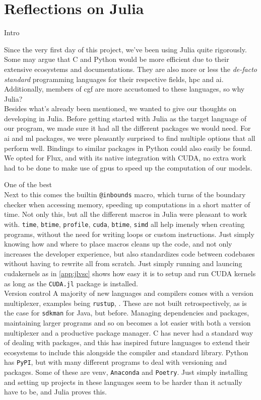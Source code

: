 \section*{Reflections on Julia}
\label{sec:juliaref}

Intro

Since the very first day of this project, we've been using Julia quite rigorously. Some may argue that C and Python would be more efficient due to their extensive ecosystems and documentations. They are also more or less the \textit{de-facto standard} programming languages for their respective fields, \acrshort{hpc} and \acrshort{ai}. Additionally, members of \acrshort{cgf} are more accustomed to these languages, so why Julia? \\

Besides what's already been mentioned, we wanted to give our thoughts on developing in Julia. Before getting started with Julia as the target language of our program, we made sure it had all the different packages we would need. For \acrshort{ai} and \acrshort{ml} packages, we were pleasantly surprised to find multiple options that all perform well. Bindings to similar packages in Python could also easily be found. We opted for Flux, and with its native integration with CUDA, no extra work had to be done to make use of \acrshort{gpu}s to speed up the computation of our models.

One of the best \\ 
Next to this comes the builtin \texttt{@inbounds} macro, which turns of the boundary checker when accessing memory, speeding up computations in a short matter of time. Not only this, but all the different macros in Julia were pleasant to work with. \texttt{time}, \texttt{btime}, \texttt{profile}, \texttt{cuda}, \texttt{btime}, \texttt{simd} all help imensly when creating programs, without the need for writing loops or custom instructions. Just simply knowing how and where to place macros cleans up the code, and not only increases the developer experience, but also standardizes code between codebases without having to rewrite all from scratch. Just simply running and launcing cudakernels as in \ref{app:jlvsc} shows how easy it is to setup and run CUDA kernels as long as the \texttt{CUDA.jl} package is installed. \\

Version control
A majority of new languages and compilers comes with a version multiplexer, examples being \texttt{rustup}, \texttt{}. These are not built retrospectively, as is the case for \texttt{sdkman} for Java, but before. Managing dependencies and packages, maintaining larger programs and so on becomes a lot easier with both a version multiplexer and a productive package manager. C has never had a standard way of dealing with packages, and this has inspired future languages to extend their ecosystems to include this alongside the compiler and standard library. Python has \texttt{PyPI}, but with many different programs to deal with versioning and packages. Some of these are venv, \texttt{Anaconda} and \texttt{Poetry}. Just simply installing and setting up projects in these languages seem to be harder than it actually have to be, and Julia proves this. \\ 

